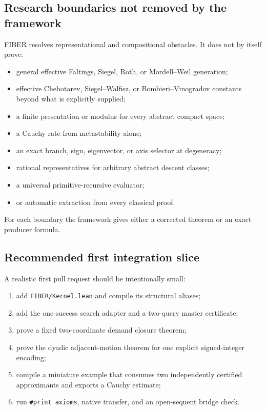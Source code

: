 \subsection{Research boundaries not removed by the framework}

FIBER resolves representational and compositional obstacles.  It does not by
itself prove:

\begin{itemize}
\item general effective Faltings, Siegel, Roth, or Mordell--Weil generation;
\item effective Chebotarev, Siegel--Walfisz, or Bombieri--Vinogradov constants
      beyond what is explicitly supplied;
\item a finite presentation or modulus for every abstract compact space;
\item a Cauchy rate from metastability alone;
\item an exact branch, sign, eigenvector, or axis selector at degeneracy;
\item rational representatives for arbitrary abstract descent classes;
\item a universal primitive-recursive evaluator;
\item or automatic extraction from every classical proof.
\end{itemize}

For each boundary the framework gives either a corrected theorem or an exact
producer formula.

\subsection{Recommended first integration slice}

A realistic first pull request should be intentionally small:

\begin{enumerate}
\item add \texttt{FIBER/Kernel.lean} and compile its structural aliases;
\item add the one-success search adapter and a two-query master certificate;
\item prove a fixed two-coordinate demand closure theorem;
\item prove the dyadic adjacent-motion theorem for one explicit signed-integer
      encoding;
\item compile a miniature example that consumes two independently certified
      approximants and exports a Cauchy estimate;
\item run \texttt{\#print axioms}, native transfer, and an open-sequent bridge
      check.
\end{enumerate}

